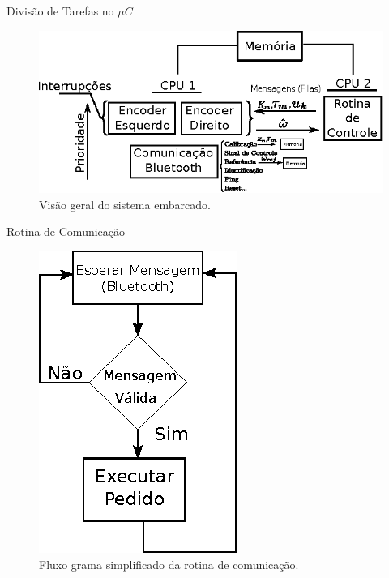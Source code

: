 \begin{frame}{Divisão de Tarefas no $\mu{}C$}
    \begin{figure}
        \centering
        \includegraphics[width=1.0\textwidth]{figuras/ilustracoes/visao_geral_do_sistema.eps}
        \caption{Visão geral do sistema embarcado.}
    \end{figure}
\end{frame}

\begin{frame}{Rotina de Comunicação}
    
    \begin{figure}
        \centering
        \includegraphics{figuras/ilustracoes/ilustracao_rotina_de_comunicacao.eps}
        \caption{Fluxo grama simplificado da rotina de comunicação.}
    \end{figure}
        
\end{frame}


